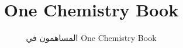 \documentclass[11pt,a4paper,twoside,openany]{book}
\title{One Chemistry Book}
\author{المساهمون في One Chemistry Book}
\date{\bookdate}
\begin{document}
\frontmatter




\tableofcontents

\mainmatter



\appendix
\part{\omsolutionspart}


\backmatter
\renewcommand{\indexspace}{\par\vskip 8pt plus 4pt minus 4pt\relax}
\printindex
\end{document}
